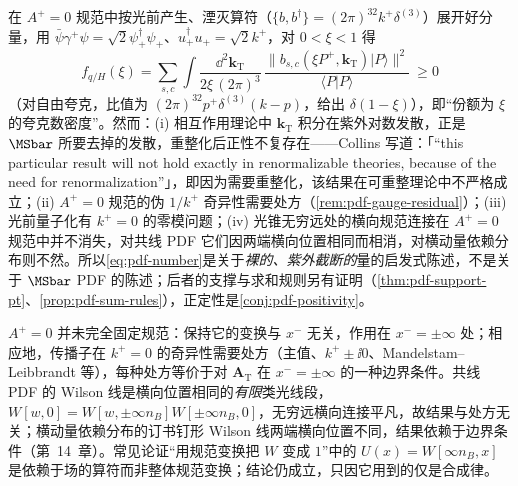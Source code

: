 \begin{remark}\label{rem:pdf-number-density}
在 $A^+=0$ 规范中按光前产生、湮灭算符（$\{b,b^\dagger\}=(2\pi)^32k^+\delta^{(3)}$）展开好分量，用 $\bar\psi\gamma^+\psi=\sqrt2\psi_+^\dagger\psi_+$、$u_+^\dagger u_+=\sqrt2k^+$，对 $0<\xi<1$ 得
\begin{equation}\label{eq:pdf-number}
f_{q/H}(\xi)=\sum_{s,c}\int\frac{\dd^{2}\bm k_{\mathrm T}}{2\xi\,(2\pi)^3}\,
\frac{\big\|b_{s,c}(\xi P^+,\bm k_{\mathrm T})|P\rangle\big\|^2}{\langle P|P\rangle}\ \ge0
\end{equation}
（对自由夸克，比值为 $(2\pi)^32p^+\delta^{(3)}(k-p)$，给出 $\delta(1-\xi)$），即“份额为 $\xi$ 的夸克数密度”\cite[第~6.7~节、第~6.9.1~节]{Collins2011}。然而：(i) 相互作用理论中 $\bm k_{\mathrm T}$ 积分在紫外对数发散，正是 $\MSbar$ 所要去掉的发散，重整化后正性不复存在——Collins 写道：「“this particular result will not hold exactly in renormalizable theories, because of the need for renormalization”」\cite[第~6.9.1~节]{Collins2011}，即因为需要重整化，该结果在可重整理论中不严格成立；(ii) $A^+=0$ 规范的伪 $1/k^+$ 奇异性需要处方（\cref{rem:pdf-gauge-residual}）；(iii) 光前量子化有 $k^+=0$ 的零模问题；(iv) 光锥无穷远处的横向规范连接在 $A^+=0$ 规范中并不消失\cite{JiYuan2002,BelitskyJiYuan2003}，对共线 PDF 它们因两端横向位置相同而相消，对横动量依赖分布则不然。所以\cref{eq:pdf-number}是关于\emph{裸的、紫外截断的}量的启发式陈述，不是关于 $\MSbar$ PDF 的陈述；后者的支撑与求和规则另有证明（\cref{thm:pdf-support-pt}、\cref{prop:pdf-sum-rules}），正定性是\cref{conj:pdf-positivity}。
\end{remark}

\begin{remark}[光锥规范的剩余规范自由与 $1/k^+$ 处方]\label{rem:pdf-gauge-residual}
$A^+=0$ 并未完全固定规范：保持它的变换与 $x^-$ 无关，作用在 $x^-=\pm\infty$ 处；相应地，传播子在 $k^+=0$ 的奇异性需要处方（主值、$k^+\pm\ii0$、Mandelstam--Leibbrandt 等），每种处方等价于对 $\bm A_{\mathrm T}$ 在 $x^-=\pm\infty$ 的一种边界条件。共线 PDF 的 Wilson 线是横向位置相同的\emph{有限}类光线段，$W[w,0]=W[w,\pm\infty n_B]W[\pm\infty n_B,0]$，无穷远横向连接平凡，故结果与处方无关；横动量依赖分布的订书钉形 Wilson 线两端横向位置不同，结果依赖于边界条件（第~14~章）。常见论证“用规范变换把 $W$ 变成 $1$”中的 $U(x)=W[\infty n_B,x]$ 是依赖于场的算符而非整体规范变换；结论仍成立，只因它用到的仅是合成律。
\end{remark}

